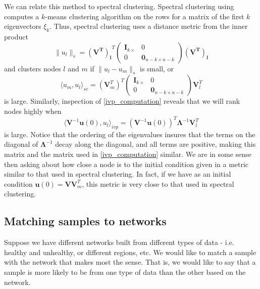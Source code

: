 \documentclass[10pt]{article}
\theoremstyle{definition}
\numberwithin{theorem}{section}
\numberwithin{definition}{section}
\numberwithin{lemma}{section}
\numberwithin{corollary}{section}
\numberwithin{clm}{section}
\numberwithin{rmk}{section}
\renewcommand{\b}{\bm}
\begin{document}
We can relate this method to spectral clustering. Spectral clustering using computes a $k$-means clustering algorithm on the rows for a matrix of the first $k$ eigenvectors $\xi_k$. Thus, spectral clustering uses a distance metric from the inner product
\[
\|u_l\|_s = \b{(V^T)_l}^T \begin{pmatrix}
\b{I}_{k\times } & 0 \\
0 & \b{0}_{n-k \times n-k} 
\end{pmatrix}
\b{(V^T)_l}
\]
and clusters nodes $l$ and $m$ if $\|u_l- u_m\|_s$ is small, or
\begin{equation}
\langle u_m, u_l\rangle_{sc} = (\b{V}^T_m)^T \begin{pmatrix}
\b{I}_{k\times } & 0 \\
0 & \b{0}_{n-k \times n-k} 
\end{pmatrix}
\b{V}^T_l
\end{equation}
is large. Similarly, inspection of \cref{ivp_computation} reveals that we will rank nodes highly when
\begin{equation}
\langle \b{V}^{-1} \b{u}(0) , u_l\rangle_{ivp}  = (\b{V}^{-1}\b{u}(0))^T\b{\Lambda}^{-1} \b{V}^T_l
\end{equation}
is large.  Notice that the ordering of the eigenvalues insures that the terms on the diagonal of $\b{\Lambda}^{-1}$ decay along the diagonal, and all terms are positive, making this matrix and the matrix used in \cref{ivp_computation} similar. We are in some sense then asking about how close a node is to the initial condition given in a metric similar to that used in spectral clustering. In fact, if we have as an initial condition $\b{u}(0) = \b{V} \b{V}_m^T$, this metric is very close to that used in spectral clustering.

\subsection{Matching samples to networks}

Suppose we have different networks built from different types of data - i.e. healthy and unhealthy, or different regions, etc. We would like to match a sample with the network that makes most the sense. That is, we would like to say that a sample is more likely to be from one type of data than the other based on the network.
\end{document}
